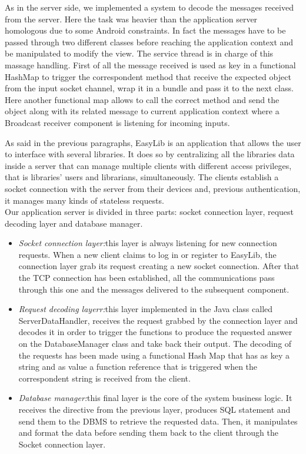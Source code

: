 As in the server side, we implemented a system to decode the messages received from the server. Here the task was heavier than the application server homologous due to some Android constraints. In fact the messages have to be passed through two different classes before reaching the application context and be manipulated to modify the view. The service thread is in charge of this massage handling. First of all the message received is used as key in a functional HashMap to trigger the correspondent method that receive the expected object from the input socket channel, wrap it in a bundle and pass it to the next class. Here another functional map allows to call the correct method and send the object along with its related message to current application context where a Broadcast receiver component is listening for incoming inputs.

As said in the previous paragraphs, EasyLib is an application that allows the user to interface with several libraries. It does so by centralizing all the libraries data inside a server that can manage multiple clients with different access privileges, that is libraries’ users and librarians, simultaneously. The clients establish a socket connection with the server from their devices and, previous authentication, it manages many kinds of stateless requests. \\
Our application server is divided in three parts: socket connection layer, request decoding layer and database manager.

\begin{itemize}
\item \emph{Socket connection layer:}this layer is always listening for new connection requests. When a new client claims to log in or register to EasyLib, the connection layer grab its request creating a new socket connection. After that the TCP connection has been established, all the communications pass through this one and the messages delivered to the subsequent component.
\item \emph{Request decoding layerr:}this layer implemented in the Java class called ServerDataHandler, receives the request grabbed by the connection layer and decodes it in order to trigger the functions to produce the requested answer on the DatabaseManager class and take back their output. The decoding of the requests has been made using a functional Hash Map that has as key a string and as value a function reference that is triggered when the correspondent string is received from the client.
\item \emph{Database manager:}this final layer is the core of the system business logic. It receives the directive from the previous layer, produces SQL statement and send them to the DBMS to retrieve the requested data. Then, it manipulates and format the data before sending them back to the client through the Socket connection layer.
\end{itemize}


